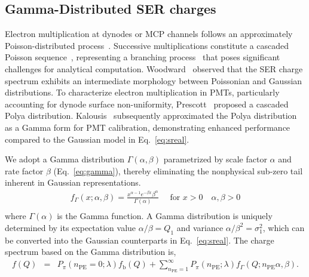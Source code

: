 \subsection{Gamma-Distributed SER charges}\label{gammapossion}
Electron multiplication at dynodes or MCP channels follows an approximately Poisson-distributed process~\cite{branchandPoisson}. Successive multiplications constitute a cascaded Poisson sequence~\cite{1955Scintillation}, representing a branching process~\cite{Bartlett1963TheTO} that poses significant challenges for analytical computation. Woodward~\cite{Woodward} observed that the SER charge spectrum exhibits an intermediate morphology between Poissonian and Gaussian distributions. To characterize electron multiplication in PMTs, particularly accounting for dynode surface non-uniformity, Prescott~\cite{polya} proposed a cascaded Polya distribution. Kalousis~\cite{2012Calibration,2020A} subsequently approximated the Polya distribution as a Gamma form for PMT calibration, demonstrating enhanced performance compared to the Gaussian model in Eq.~\eqref{eq:sreal}.

We adopt a Gamma distribution $\varGamma(\alpha, \beta)$ parametrized by scale factor $\alpha$ and rate factor $\beta$ (Eq.~\eqref{eq:gamma}), thereby eliminating the nonphysical sub-zero tail inherent in Gaussian representations.
\begin{equation}
	\label{eq:gamma}
	\begin{aligned}
		f_\Gamma(x ; \alpha, \beta) = \frac{x^{\alpha-1} e^{-\beta x} \beta^\alpha}{\Gamma(\alpha)} \quad \text { for } x>0 \quad \alpha, \beta>0 \\
	\end{aligned}
\end{equation}
where $\Gamma(\alpha)$ is the Gamma function.
A Gamma distribution is uniquely determined by its expectation value \(\alpha/\beta=Q_1\) and variance \(\alpha/\beta^2=\sigma_1^2\),
which can be converted into the Gaussian counterparts in Eq.~\eqref{eq:sreal}.
The charge spectrum based on the Gamma distribution is,
\begin{equation}
	\begin{aligned}
		f(Q) & = & P_{\pi}(n_{\mathrm{PE}}=0;\lambda)f_{\mathrm{b}}(Q) + \sum_{n_{\mathrm{PE}}=1}^{\infty}P_\pi(n_{\mathrm{PE}};\lambda) f_\Gamma(Q;n_{\mathrm{PE}}\alpha, \beta). \\
	\end{aligned}
	\label{eq:Gamma}
\end{equation}

